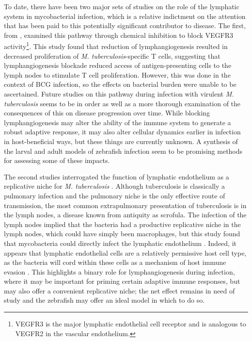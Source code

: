 To date, there have been two major sets of studies on the role of the lymphatic system in mycobacterial infection, which is a relative indictment on the attention that has been paid to this potentially significant contributor to disease. The first, from \citet{Harding2015}, examined this pathway through chemical inhibition to block VEGFR3 activity\footnote{VEGFR3 is the major lymphatic endothelial cell receptor and is analogous to VEGFR2 in the vascular endothelium.}. This study found that reduction of lymphangiogenesis resulted in decreased proliferation of \textit{M. tuberculosis}-specific T cells, suggesting that lymphangiogenesis blockade reduced access of antigen-presenting cells to the lymph nodes to stimulate T cell proliferation. However, this was done in the context of BCG infection, so the effects on bacterial burden were unable to be ascertained. Future studies on this pathway during infection with virulent \textit{M. tuberculosis} seems to be in order as well as a more thorough examination of the consequences of this on disease progression over time. While blocking lymphangiogenesis may alter the ability of the immune system to generate a robust adaptive response, it may also alter cellular dynamics earlier in infection in host-beneficial ways, but these things are currently unknown. A synthesis of the larval and adult models of zebrafish infection seem to be promising methods for assessing some of these impacts.

The second studies interrogated the function of lymphatic endothelium as a replicative niche for \textit{M. tuberculosis} \citep{Lerner2016, Lerner2020}. Although tuberculosis is classically a pulmonary infection and the pulmonary niche is the only effective route of transmission, the most common extrapulmonary presentation of tuberculosis is in the lymph nodes, a disease known from antiquity as scrofula. The infection of the lymph nodes implied that the bacteria had a productive replicative niche in the lymph nodes, which could have simply been macrophages, but this study found that mycobacteria could directly infect the lymphatic endothelium \citep{Lerner2016}. Indeed, it appears that lymphatic endothelial cells are a relatively permissive host cell type, as the bacteria will cord within these cells as a mechanism of host immune evasion \citep{Lerner2020}. This highlights a binary role for lymphangiogenesis during infection, where it may be important for priming certain adaptive immune responses, but may also offer a convenient replicative niche; the net effect remains in need of study and the zebrafish may offer an ideal model in which to do so.


